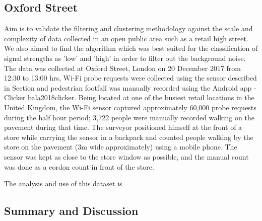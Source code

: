 \subsection{Oxford Street}

Aim is to validate the filtering and clustering methodology against the scale and complexity of data collected in an open public area such as a retail high street.
We also aimed to find the algorithm which was best suited for the classification of signal strengths as 'low' and 'high' in order to filter out the background noise.
The data was collected at Oxford Street, London on 20 December 2017 from 12:30 to 13:00 hrs, Wi-Fi probe requests were collected using the sensor described in Section and pedestrian footfall was manually recorded using the Android app - Clicker bala2018clicker.
Being located at one of the busiest retail locations in the United Kingdom, the Wi-Fi sensor captured approximately 60,000 probe requests during the half hour period; 3,722 people were manually recorded walking on the pavement during that time.
The surveyor positioned himself at the front of a store while carrying the sensor in a backpack and counted people walking by the store on the pavement (3m wide approximately) using a mobile phone.
The sensor was kept as close to the store window as possible, and the manual count was done as a cordon count in front of the store.

The analysis and use of this dataset is 

\subsection{Summary and Discussion}
